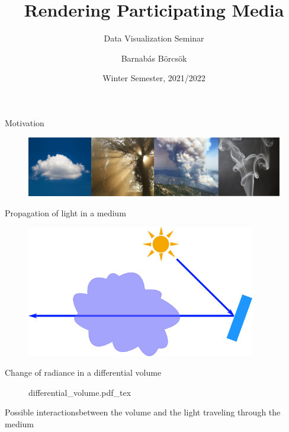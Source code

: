 \documentclass[
  english,            %
  aspectratio=169,    %
]{tumbeamer}
\title{Rendering Participating Media}
\subtitle{Data Visualization Seminar}
\author{Barnabás Börcsök}
\institute{\theChairName\\\theDepartmentName\\\theUniversityName}
\date[WS 2021/2022]{Winter Semester, 2021/2022}
\newcommand{\incfig}[1]{%
    \def\svgwidth{\columnwidth}
    {#1.pdf_tex}
}
\begin{document}
\maketitle

\begin{frame}{Motivation}
  \begin{figure}
      \centering
      \includegraphics{img/teaser.png}
      \label{fig:teaser}
  \end{figure}
\end{frame}

\begin{frame}{Propagation of light in a medium}
    \begin{figure}[ht]
        \centering
        \def\svgwidth{\columnwidth}
        \includegraphics[width=10cm]{img/propagation-illustration.png}
    \end{figure}
\end{frame}

\begin{frame}{Change of radiance in a differential volume}
    \begin{figure}[ht]
        \centering
        \incfig{differential_volume}
        \label{fig:vre}
    \end{figure}
\end{frame}


\begin{frame}{Possible interactions}{between the volume and the light
    traveling through the medium}
\begin{figure}[ht]
    \centering
    
    \label{fig:interactions}
\end{figure}
\end{frame}
\end{document}
